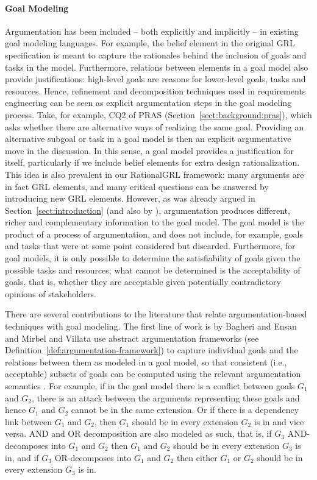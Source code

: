 \paragraph{Goal Modeling} Argumentation has been included -- both explicitly and implicitly -- in existing goal modeling languages. For example, the belief element in the original GRL specification \cite{Amyot:2010:EGM:1841349.1841356} is meant to capture the rationales behind the inclusion of goals and tasks in the model. Furthermore, relations between elements in a goal model also provide justifications: high-level goals are reasons for lower-level goals, tasks and resources. Hence, refinement and decomposition techniques used in requirements engineering \cite{van2001goal} can be seen as explicit argumentation steps in the goal modeling process. Take, for example, CQ2 of PRAS (Section~\ref{sect:background:pras}), which asks whether there are alternative ways of realizing the same goal. Providing an alternative subgoal or task in a goal model is then an explicit argumentative move in the discussion. In this sense, a goal model provides a justification for itself, particularly if we include belief elements for extra design rationalization. This idea is also prevalent in our RationalGRL framework: many arguments are in fact GRL elements, and many critical questions can be answered by introducing new GRL elements. However, as was already argued in Section~\ref{sect:introduction} (and also by \cite{Jureta:RE2008}), argumentation produces different, richer and complementary information to the goal model. The goal model is the product of a process of argumentation, and does not include, for example, goals and tasks that were at some point considered but discarded. Furthermore, for goal models, it is only possible to determine the satisfiability of goals given the possible tasks and resources; what cannot be determined is the acceptability of goals, that is, whether they are acceptable given potentially contradictory opinions of stakeholders.  

There are several contributions to the literature that relate argumentation-based techniques with goal modeling. The first line of work is by Bagheri and Ensan \cite{bagheri2011consolidating} and Mirbel and Villata \cite{MirbelVillata12} use abstract argumentation frameworks (see Definition~\ref{def:argumentation-framework}) to capture individual goals and the relations between them as modeled in a goal model, so that consistent (i.e., acceptable) subsets of goals can be computed using the relevant argumentation semantics \cite{Dung1995}. For example, if in the goal model there is a conflict between goals $G_1$ and $G_2$, there is an attack between the arguments representing these goals and hence $G_1$ and $G_2$ cannot be in the same extension. Or if there is a dependency link between $G_1$ and $G_2$, then $G_1$ should be in every extension $G_2$ is in and vice versa. AND and OR decomposition are also modeled as such, that is, if $G_3$ AND-decomposes into $G_1$ and $G_2$ then $G_1$ and $G_2$ should be in every extension $G_3$ is in, and if $G_3$ OR-decomposes into $G_1$ and $G_2$ then either $G_1$ or $G_2$ should be in every extension $G_3$ is in. 

